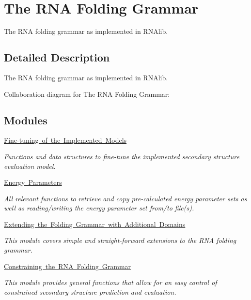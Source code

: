 \hypertarget{group__grammar}{}\section{The R\+NA Folding Grammar}
\label{group__grammar}


The R\+NA folding grammar as implemented in R\+N\+Alib.  




\subsection{Detailed Description}
The R\+NA folding grammar as implemented in R\+N\+Alib. 

Collaboration diagram for The R\+NA Folding Grammar\+:
\subsection*{Modules}
\begin{DoxyCompactItemize}
\item 
\mbox{\hyperlink{group__model__details}{Fine-\/tuning of the Implemented Models}}
\begin{DoxyCompactList}\small\item\em Functions and data structures to fine-\/tune the implemented secondary structure evaluation model. \end{DoxyCompactList}\item 
\mbox{\hyperlink{group__energy__parameters}{Energy Parameters}}
\begin{DoxyCompactList}\small\item\em All relevant functions to retrieve and copy pre-\/calculated energy parameter sets as well as reading/writing the energy parameter set from/to file(s). \end{DoxyCompactList}\item 
\mbox{\hyperlink{group__domains}{Extending the Folding Grammar with Additional Domains}}
\begin{DoxyCompactList}\small\item\em This module covers simple and straight-\/forward extensions to the R\+NA folding grammar. \end{DoxyCompactList}\item 
\mbox{\hyperlink{group__constraints}{Constraining the R\+N\+A Folding Grammar}}
\begin{DoxyCompactList}\small\item\em This module provides general functions that allow for an easy control of constrained secondary structure prediction and evaluation. \end{DoxyCompactList}\end{DoxyCompactItemize}
